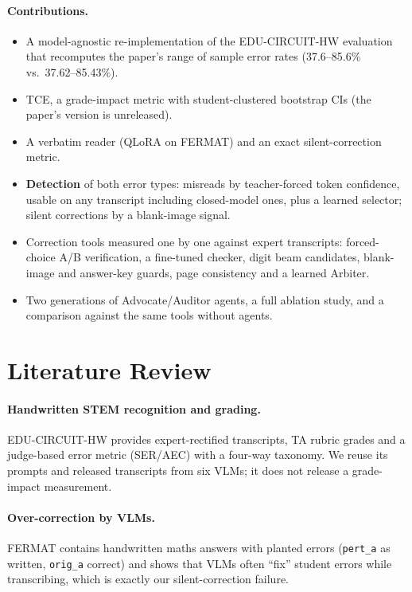 \documentclass[11pt]{article}
\newcommand{\tool}[1]{\texttt{\small #1}}
\begin{document}
\paragraph{Contributions.}
\begin{itemize}
  \item A model-agnostic re-implementation of the EDU-CIRCUIT-HW evaluation that recomputes the paper's range of sample error rates (37.6--85.6\% vs.\ 37.62--85.43\%).
  \item TCE, a grade-impact metric with student-clustered bootstrap CIs (the paper's version is unreleased).
  \item A verbatim reader (QLoRA on FERMAT) and an exact silent-correction metric.
  \item \textbf{Detection} of both error types: misreads by teacher-forced token confidence, usable on any transcript including closed-model ones, plus a learned selector; silent corrections by a blank-image signal.
  \item Correction tools measured one by one against expert transcripts: forced-choice A/B verification, a fine-tuned checker, digit beam candidates, blank-image and answer-key guards, page consistency and a learned Arbiter.
  \item Two generations of Advocate/Auditor agents, a full ablation study, and a comparison against the same tools without agents.
\end{itemize}

\section{Literature Review}

\paragraph{Handwritten STEM recognition and grading.} EDU-CIRCUIT-HW \citep{educircuit2026} provides expert-rectified transcripts, TA rubric grades and a judge-based error metric (SER/AEC) with a four-way taxonomy. We reuse its prompts and released transcripts from six VLMs; it does not release a grade-impact measurement.

\paragraph{Over-correction by VLMs.} FERMAT \citep{fermat2025} contains handwritten maths answers with planted errors (\tool{pert\_a} as written, \tool{orig\_a} correct) and shows that VLMs often ``fix'' student errors while transcribing, which is exactly our silent-correction failure.
\end{document}
